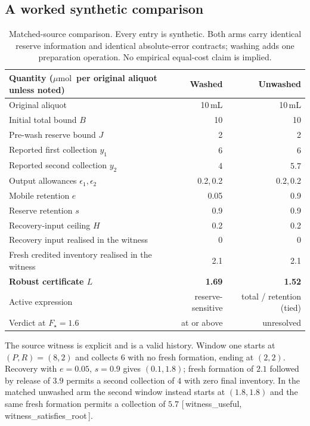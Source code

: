 \documentclass[11pt]{article}
\theoremstyle{plain}
\theoremstyle{definition}
\theoremstyle{remark}
\newcommand{\mumol}{\ensuremath{\mu\mathrm{mol}}}
\newcommand{\leanref}[1]{{\normalfont\sffamily\footnotesize[\,#1\,]}}
\newcommand{\Lc}{L}
\begin{document}
\subsection{A worked synthetic comparison}\label{sec:worked}

\begin{table}[t]
\centering
\small
\begin{tabular}{lrr}
\toprule
Quantity (\mumol\ per original aliquot unless noted) & Washed & Unwashed \\
\midrule
Original aliquot & 10\,mL & 10\,mL\\
Initial total bound $B$ & 10 & 10\\
Pre-wash reserve bound $J$ & 2 & 2\\
Reported first collection $y_1$ & 6 & 6\\
Reported second collection $y_2$ & 4 & 5.7\\
Output allowances $\epsilon_1,\epsilon_2$ & 0.2,\,0.2 & 0.2,\,0.2\\
Mobile retention $e$ & 0.05 & 0.9\\
Reserve retention $s$ & 0.9 & 0.9\\
Recovery-input ceiling $H$ & 0.2 & 0.2\\
\midrule
Recovery input realised in the witness & 0 & 0\\
Fresh credited inventory realised in the witness & 2.1 & 2.1\\
\midrule
\textbf{Robust certificate $\Lc$} & \textbf{1.69} & \textbf{1.52}\\
Active expression & reserve-sensitive & total / retention (tied)\\
Verdict at $F_\star=1.6$ & at or above & unresolved\\
\bottomrule
\end{tabular}
\caption{Matched-source comparison. Every entry is synthetic. Both arms carry
identical reserve information and identical absolute-error contracts; washing
adds one preparation operation. No empirical equal-cost claim is implied.}
\label{tab:example}
\end{table}

The source witness is explicit and is a valid history. Window one starts at
$(P,R)=(8,2)$ and collects $6$ with no fresh formation, ending at $(2,2)$.
Recovery with $e=0.05$, $s=0.9$ gives $(0.1,1.8)$; fresh formation of $2.1$
followed by release of $3.9$ permits a second collection of $4$ with zero
final inventory. In the matched unwashed arm the second window instead starts
at $(1.8,1.8)$ and the same fresh formation permits a collection of $5.7$
\leanref{witness\_useful, witness\_satisfies\_root}.
\end{document}
